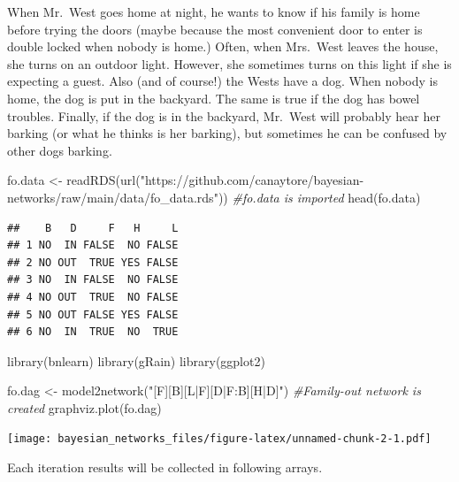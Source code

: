 \documentclass[
]{article}
\newenvironment{Shaded}{\begin{snugshade}}{\end{snugshade}}
\newcommand{\CommentTok}[1]{\textcolor[rgb]{0.56,0.35,0.01}{\textit{#1}}}
\newcommand{\FunctionTok}[1]{\textcolor[rgb]{0.00,0.00,0.00}{#1}}
\newcommand{\NormalTok}[1]{#1}
\newcommand{\OtherTok}[1]{\textcolor[rgb]{0.56,0.35,0.01}{#1}}
\newcommand{\StringTok}[1]{\textcolor[rgb]{0.31,0.60,0.02}{#1}}
\begin{document}
When Mr.~West goes home at night, he wants to know if his family is home before trying the doors (maybe because the most convenient door to enter is double locked when nobody is home.) Often, when Mrs.~West leaves the house, she turns on an outdoor light. However, she sometimes turns on this light if she is expecting a guest. Also (and of course!) the Wests have a dog. When nobody is home, the dog is put in the backyard. The same is true if the dog has bowel troubles. Finally, if the dog is in the backyard, Mr.~West will probably hear her barking (or what he thinks is her barking), but sometimes he can be confused by other dogs barking.

\begin{Shaded}
\begin{Highlighting}[]
\NormalTok{fo.data }\OtherTok{\textless{}{-}} \FunctionTok{readRDS}\NormalTok{(}\FunctionTok{url}\NormalTok{(}\StringTok{"https://github.com/canaytore/bayesian{-}networks/raw/main/data/fo\_data.rds"}\NormalTok{)) }\CommentTok{\#fo.data is imported}
\FunctionTok{head}\NormalTok{(fo.data)}
\end{Highlighting}
\end{Shaded}

\begin{verbatim}
##    B   D     F   H     L
## 1 NO  IN FALSE  NO FALSE
## 2 NO OUT  TRUE YES FALSE
## 3 NO  IN FALSE  NO FALSE
## 4 NO OUT  TRUE  NO FALSE
## 5 NO OUT FALSE YES FALSE
## 6 NO  IN  TRUE  NO  TRUE
\end{verbatim}

\begin{Shaded}
\begin{Highlighting}[]
\FunctionTok{library}\NormalTok{(bnlearn)}
\FunctionTok{library}\NormalTok{(gRain)}
\FunctionTok{library}\NormalTok{(ggplot2)}

\NormalTok{fo.dag }\OtherTok{\textless{}{-}} \FunctionTok{model2network}\NormalTok{(}\StringTok{"[F][B][L|F][D|F:B][H|D]"}\NormalTok{) }\CommentTok{\#Family{-}out network is created}
\FunctionTok{graphviz.plot}\NormalTok{(fo.dag)}
\end{Highlighting}
\end{Shaded}

\texttt{[image: bayesian\_networks\_files/figure-latex/unnamed-chunk-2-1.pdf]}

Each iteration results will be collected in following arrays.
\end{document}
